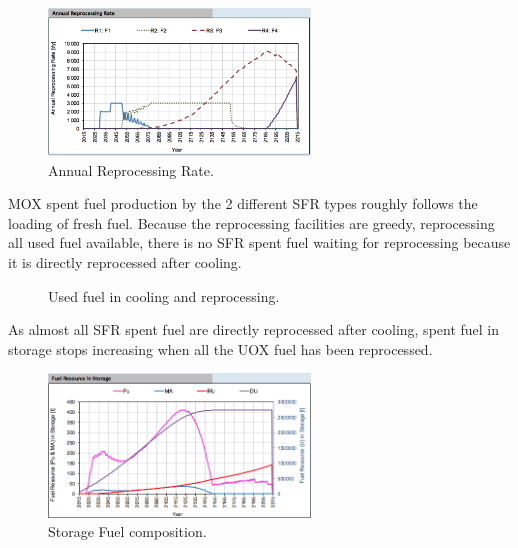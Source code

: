 \documentclass[12pt]{article}
\begin{document}
\begin{figure}[h!]
    \centering
    \includegraphics[width=0.62\textwidth]        {img/AnnualReprocessingRate_1}
    \caption{Annual Reprocessing Rate.}
    \label{fig:reprocessing_1}
\end{figure}


MOX spent fuel production by the 2 different SFR types roughly follows the
loading of fresh fuel.  Because the reprocessing facilities are greedy,
reprocessing all used fuel available, there is no SFR spent fuel waiting for reprocessing
because it is directly reprocessed after cooling.

\begin{figure}[h!]
    \centering
    \caption{Used fuel in cooling and reprocessing.\label{fig:cool_reprocc} }
\end{figure}

As almost all SFR spent fuel are directly reprocessed after cooling, spent
fuel in storage stops increasing when all the UOX fuel has been reprocessed.


\begin{figure}[h!]
    \centering
    \includegraphics[width=0.62\textwidth]{img/FuelInStorage_1}
    \caption{Storage Fuel composition.}
    \label{fig:storagecompo_1}
\end{figure}
\end{document}
